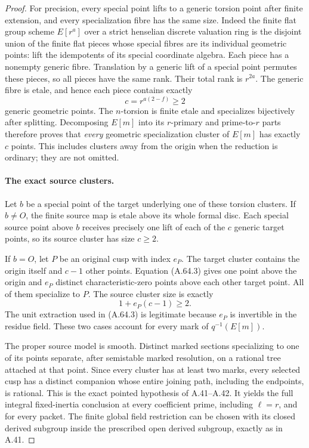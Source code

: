 \begin{proof}
For precision, every special point lifts to a
generic torsion point after finite extension,
and every specialization fibre has the same size.
Indeed the finite flat group scheme \(E[r^a]\)
over a strict henselian discrete valuation ring
is the disjoint union of the finite flat pieces
whose special fibres are its individual geometric
points: lift the idempotents of its special
coordinate algebra. Each piece has a nonempty
generic fibre. Translation by a generic lift of
a special point permutes these pieces, so all
pieces have the same rank. Their total rank is
\(r^{2a}\). The generic fibre is etale, and hence
each piece contains exactly
\[
                             c=r^{a(2-f)}\ge2           \tag{A.64.4}
\]
generic geometric points. The \(n\)-torsion is
finite etale and specializes bijectively after
splitting. Decomposing \(E[m]\) into its
\(r\)-primary and prime-to-\(r\) parts therefore
proves that \emph{every} geometric specialization
cluster of \(E[m]\) has exactly \(c\) points.
This includes clusters away from the origin when
the reduction is ordinary; they are not omitted.

\paragraph{The exact source clusters.}
Let \(b\) be a special point of the target
underlying one of these torsion clusters.
If \(b\ne O\), the finite source map is etale
above its whole formal disc. Each special source
point above \(b\) receives precisely one lift
of each of the \(c\) generic target points,
so its source cluster has size \(c\ge2\).

If \(b=O\), let \(P\) be an original cusp
with index \(e_P\). The target cluster contains
the origin itself and \(c-1\) other points.
Equation (A.64.3) gives one point above the
origin and \(e_P\) distinct characteristic-zero
points above each other target point. All of
them specialize to \(P\). The source cluster
size is exactly
\[
                              1+e_P(c-1)\ge2.          \tag{A.64.5}
\]
The unit extraction used in (A.64.3) is legitimate
because \(e_P\) is invertible in the residue
field. These two cases account for every mark
of \(q^{-1}(E[m])\).

The proper source model is smooth. Distinct
marked sections specializing to one of its
points separate, after semistable marked
resolution, on a rational tree attached at
that point. Since every cluster has at least
two marks, every selected cusp has a distinct
companion whose entire joining path, including
the endpoints, is rational. This is the exact
pointed hypothesis of A.41--A.42. It yields the
full integral fixed-inertia conclusion at
every coefficient prime, including \(\ell=r\),
and for every packet. The finite global field
restriction can be chosen with its closed
derived subgroup inside the prescribed open
derived subgroup, exactly as in A.41.


\end{proof}
